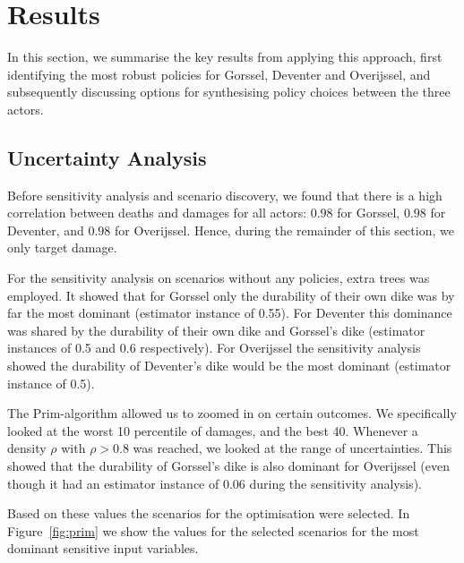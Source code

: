 \section{Results}
\label{s:results}

In this section, we summarise the key results from applying this approach, first identifying the most robust policies for Gorssel, Deventer and Overijssel, and subsequently discussing options for synthesising policy choices between the three actors. 


\subsection{Uncertainty Analysis}
Before sensitivity analysis and scenario discovery, we found that there is a high correlation between deaths and damages for all actors: $0.98$ for Gorssel, $0.98$ for Deventer, and $0.98$ for Overijssel. Hence, during the remainder of this section, we only target damage.

For the sensitivity analysis on scenarios without any policies, extra trees was employed. It showed that for Gorssel only the durability of their own dike was by far the most dominant (estimator instance of 0.55). For Deventer this dominance was shared by the durability of their own dike and Gorssel's dike (estimator instances of 0.5 and 0.6 respectively). For Overijssel the sensitivity analysis showed the durability of Deventer's dike would be the most dominant (estimator instance of 0.5).

The Prim-algorithm allowed us to zoomed in on certain outcomes. We specifically looked at the worst 10 percentile of damages, and the best 40. Whenever a density $\rho$ with $\rho>0.8$ was reached, we looked at the range of uncertainties. This showed that the durability of Gorssel's dike is also dominant for Overijssel (even though it had an estimator instance of 0.06 during the sensitivity analysis).

Based on these values the scenarios for the optimisation were selected. In Figure~\ref{fig:prim} we show the values for the selected scenarios for the most dominant sensitive input variables.

